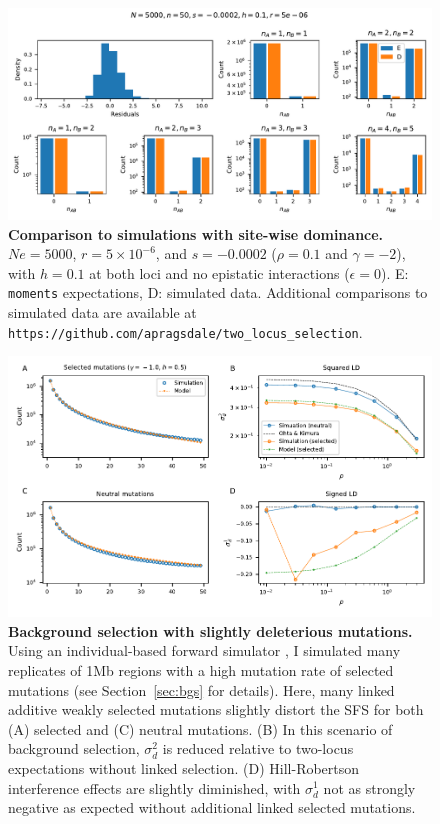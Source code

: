 \documentclass[]{article}
\begin{document}
\begin{figure}[ht!]
    \centering
    \includegraphics[width=\textwidth]{../simulations/discrete/plots/comp_Ne_5000_n_50_r_5e-06_s_0.0002_h_0.1.pdf}
    \caption{
        \textbf{Comparison to simulations with site-wise dominance.}
        \(Ne=5000\), \(r=5\times10^{-6}\), and \(s=-0.0002\) (\(\rho=0.1\) and
        \(\gamma=-2\)), with \(h=0.1\) at both loci and no
        epistatic interactions (\(\epsilon=0\)).
        E: \texttt{moments} expectations, D: simulated data.
        Additional comparisons to simulated data are available at
        \texttt{https://github.com/apragsdale/two\_locus\_selection}.
    }
    \label{fig:validation5}
\end{figure}

\begin{figure}[ht!]
    \centering
    \includegraphics{../figures/bgs_gamma_-1.0_h_0.5_n_50}
    \caption{
        \textbf{Background selection with slightly deleterious mutations.}
        Using an individual-based forward simulator \citep{Thornton2019-qc}, I
        simulated many replicates of 1Mb regions with a high mutation rate of
        selected mutations (see Section~\ref{sec:bgs} for details). Here,
        many linked additive weakly selected mutations slightly distort the
        SFS for both (A) selected and (C) neutral mutations.
        (B) In this scenario of background selection, \(\sigma_d^2\)
        is reduced relative to two-locus expectations without linked selection.
        (D) Hill-Robertson interference effects are slightly diminished, with
        \(\sigma_d^1\) not as strongly negative as expected without additional
        linked selected mutations.
    }
    \label{fig:bgs1}
\end{figure}
\end{document}
